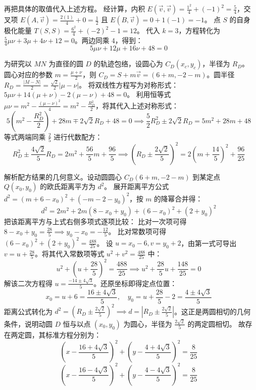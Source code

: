 \begin{solution}
再把具体的取值代入上述方程。
经计算，内积 $E(\vec{v},\vec{v}) = \frac{1^2}{4} + (-1)^2 = \frac{5}{4}$，交叉项 $E(A,\vec{v}) = \frac{2(1)}{4} + 0 = \frac{1}{2}$ 且 $E(B,\vec{v}) = 0 + 1(-1) = -1$。
点 $S$ 的自身极化能量 $T(S,S) = \frac{6^2}{4} + (-2)^2 - 1 = 12$。
代入 $k=3$，方程转化为 $\frac{5}{4}\mu\nu + 3\mu + 4\nu + 12 = 0$。两边同乘 4，得到：
$$ 5\mu\nu + 12\mu + 16\nu + 48 = 0 $$

为研究以 $MN$ 为直径的圆 $D$ 的轨迹包络，设圆心为 $C_D(x_c, y_c)$，半径为 $R_D$。
圆心对应的参数 $m = \frac{\mu+\nu}{2}$，则 $C_D = S + m\vec{v} = (6+m, -2-m)$。圆半径 $R_D = \frac{|M-N|}{2} = \frac{\sqrt{2}}{2}|\mu-\nu|$。
将双线性方程写为对称形式：$5\mu\nu + 14(\mu+\nu) - 2(\mu-\nu) + 48 = 0$。
利用恒等式 $\mu\nu = m^2 - \frac{(\mu-\nu)^2}{4} = m^2 - \frac{R_D^2}{2}$，将其代入上述对称形式：
$$ 5\left(m^2 - \frac{R_D^2}{2}\right) + 28m \mp 2\sqrt{2} R_D + 48 = 0 \implies \frac{5}{2} R_D^2 \pm 2\sqrt{2} R_D = 5m^2 + 28m + 48 $$
等式两端同乘 $\frac{2}{5}$ 进行代数配方：
$$ R_D^2 \pm \frac{4\sqrt{2}}{5} R_D = 2m^2 + \frac{56}{5}m + \frac{96}{5} \implies \left( R_D \pm \frac{2\sqrt{2}}{5} \right)^2 = 2\left( m + \frac{14}{5} \right)^2 + \frac{96}{25} $$

解析配方结果的几何意义。设动圆圆心 $C_D(6+m, -2-m)$ 到某定点 $Q(x_0, y_0)$ 的欧氏距离平方为 $d^2$。
展开距离平方公式 $d^2 = (m + 6 - x_0)^2 + (-m - 2 - y_0)^2$，按 $m$ 的降幂合并得：
$$ d^2 = 2m^2 + 2m(8 - x_0 + y_0) + (6-x_0)^2 + (2+y_0)^2 $$
把该距离平方与上式右侧多项式逐项比较：
比对一次项可得 $8 - x_0 + y_0 = \frac{28}{5} \implies y_0 - x_0 = -\frac{12}{5}$。
比对常数项可得 $(6-x_0)^2 + (2+y_0)^2 = \frac{488}{25}$。
设 $u = x_0 - 6, v = y_0 + 2$，由第一式可导出 $v = u + \frac{28}{5}$。将其代入常数项等式 $u^2 + v^2 = \frac{488}{25}$ 中：
$$ u^2 + \left( u + \frac{28}{5} \right)^2 = \frac{488}{25} \implies u^2 + \frac{28}{5}u + \frac{148}{25} = 0 $$
解该二次方程得 $u = \frac{-14 \pm 4\sqrt{3}}{5}$。还原坐标即得定点位置：
$$ x_0 = u + 6 = \frac{16 \pm 4\sqrt{3}}{5}, \quad y_0 = u + \frac{28}{5} - 2 = \frac{4 \pm 4\sqrt{3}}{5} $$
距离公式转化为 $d^2 = \left( R_D \pm \frac{2\sqrt{2}}{5} \right)^2 \implies d = \left| R_D \pm \frac{2\sqrt{2}}{5} \right|$。这正是两圆相切的几何条件，说明动圆 $D$ 恒与以点 $(x_0, y_0)$ 为圆心，半径为 $\frac{2\sqrt{2}}{5}$ 的两定圆相切。
故存在两定圆，其标准方程分别为：
$$ \left( x - \frac{16 + 4\sqrt{3}}{5} \right)^2 + \left( y - \frac{4 + 4\sqrt{3}}{5} \right)^2 = \frac{8}{25} $$
$$ \left( x - \frac{16 - 4\sqrt{3}}{5} \right)^2 + \left( y - \frac{4 - 4\sqrt{3}}{5} \right)^2 = \frac{8}{25} $$
\end{solution}

